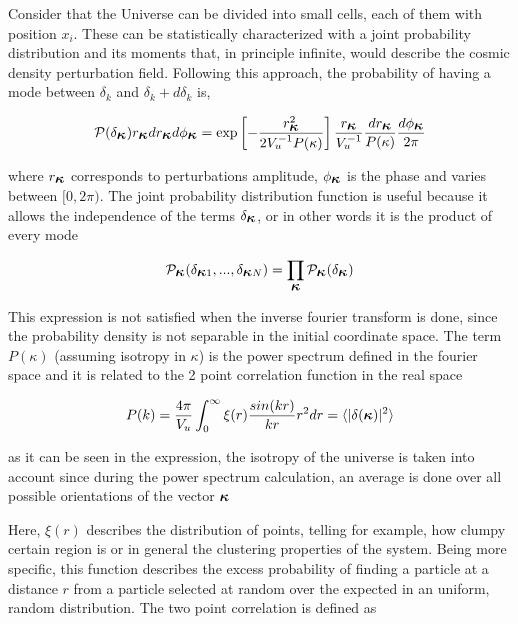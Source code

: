 Consider that the Universe can be divided into small cells, each of them with position 
$x_i$. These can be statistically characterized with a joint probability 
distribution and its moments that, in principle infinite, would describe the 
cosmic density perturbation field. 
Following this approach, the probability of having a mode between $\delta_k$ and 
$\delta_{k}+d\delta_k$ is, 

\begin{equation}
\mathcal{P}(\delta_{\mbox{\boldmath$\kappa$}})r_{\mbox{\boldmath$\kappa$}}dr_{\mbox{\boldmath$\kappa$}}d\phi_{\mbox{\boldmath$\kappa$}}
=
\exp\left[-\frac{r_{\mbox{\boldmath$\kappa$}}^2}{2V_u^{-1}P(\kappa)}\right]	\frac{r_{\mbox{\boldmath$\kappa$}}}{V_u^{-1}}
\frac{dr_{\mbox{\boldmath$\kappa$}}}{P(\kappa)}\frac{d\phi_{\mbox{\boldmath$\kappa$}}}{2\pi}
\label{probabilidad}
\end{equation}


where $r_{\mbox{\boldmath$\kappa$}}$ corresponds to perturbations amplitude,  $\phi_{\mbox{\boldmath$\kappa$}}$ 
is the phase and varies between $[0,2\pi)$. The joint probability distribution function 
is useful because it allows the independence of the terms $\delta_{\mbox{\boldmath$\kappa$}}$, 
or in other words it is the product of every mode

\[
\mathcal{P}_{\mbox{\boldmath$\kappa$}}(\delta_{\mbox{\boldmath$\kappa$}1},...,\delta_{\mbox{\boldmath$\kappa$}N})=
\prod_{\mbox{\boldmath$\kappa$}}\mathcal{P}_{\mbox{\boldmath$\kappa$}}(\delta_{\mbox{\boldmath$\kappa$}})
\]


This expression is not satisfied when the inverse fourier transform is done, since the 
probability density is not separable in the initial coordinate space. The term $P(\kappa)$ 
(assuming isotropy in \mbox{\boldmath$\kappa$}) is the power spectrum defined in the 
fourier space and it is related to the 2 point correlation function in the real space

\begin{equation}
P(k) = \frac{4\pi}{V_u}\int_0^\infty \xi (r)\frac{sin(kr)}{kr}r^2dr =  \langle|\delta(\mbox{\boldmath$\kappa$})|^2\rangle
\label{pk}
\end{equation}

as it can be seen in the expression, the isotropy of the universe is taken into account since during the power spectrum calculation, an average is done over all  possible orientations of the vector ${\mbox{\boldmath$\kappa$}}$

Here, $\xi (r)$  describes the distribution of points, telling for example, how clumpy certain region is or in general the clustering properties of the system. Being more specific, this function describes the excess probability of finding a particle at a distance $r$ from a particle selected at random over the expected in an uniform, random distribution. 
The two point correlation is defined as 

